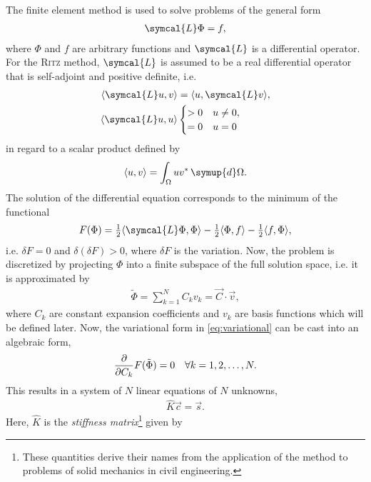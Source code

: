 The finite element method is used to solve problems of the general form
\begin{gather}
  \symcal{L} \Phi = f, \label{eq:fem}
\end{gather}
where $\Phi$ and $f$ are arbitrary functions and $\symcal{L}$ is a differential operator. For the \textsc{Ritz} method, $\symcal{L}$ is assumed to be a real differential operator that is self-adjoint and positive definite, i.e.
\begin{align}
  \langle \symcal{L} u, v \rangle &= \langle u, \symcal{L} v \rangle, \label{eq:self-adjoint} \\
  \langle \symcal{L} u, u \rangle & \begin{cases}
    > 0 & u \neq 0, \\
    = 0 & u = 0
  \end{cases} \label{eq:positive_definite}
\end{align}
in regard to a scalar product defined by
\begin{gather}
  \langle u, v \rangle = \int_{\Omega} u v^{*} \, \symup{d} \Omega. \label{eq:scalar_prod}
\end{gather}
The solution of the differential equation corresponds to the minimum of the functional
\begin{gather}
  F(\Phi) = \tfrac{1}{2} \langle \symcal{L} \Phi, \Phi \rangle - \tfrac{1}{2} \langle \Phi, f \rangle - \tfrac{1}{2} \langle f, \Phi \rangle, \label{eq:variational}
\end{gather}
i.e. $\delta F = 0$ and $\delta (\delta F) > 0$, where $\delta F$ is the variation. Now, the problem is discretized by projecting $\Phi$ into a finite subspace of the full solution space, i.e. it is approximated by
\begin{gather}
  \tilde{\Phi} = \sum_{k = 1}^{N} C_{k} v_{k} = \vec{C} \cdot \vec{v},
\end{gather}
where $C_{k}$ are constant expansion coefficients and $v_{k}$ are basis functions which will be defined later. Now, the variational form in \cref{eq:variational} can be cast into an algebraic form,
\begin{gather}
  \frac{\partial }{\partial C_{k}} F(\tilde{\Phi}) = 0 \quad \forall k = 1, 2, \dotsc, N.
\end{gather}
This results in a system of $N$ linear equations of $N$ unknowns,
\begin{gather}
  \hat{K} \vec{c} = \vec{s}. \label{eq:ritz}
\end{gather}
Here, $\hat{K}$ is the \emph{stiffness matrix}\footnote{\label{fn:zienkiewicz}These quantities derive their names from the application of the method to problems of solid mechanics in civil engineering.} given by
